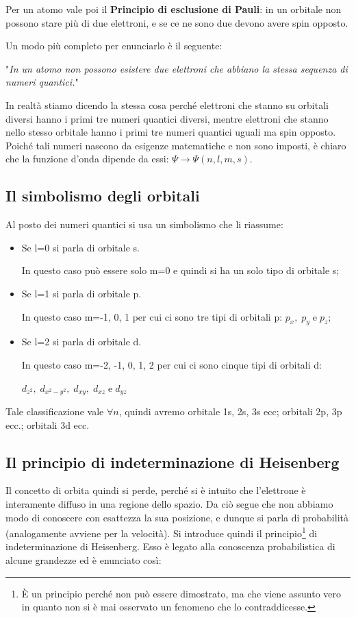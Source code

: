 Per un atomo vale poi il \textbf{Principio di esclusione di Pauli}: in un orbitale non possono stare più di due elettroni, e se ce ne sono due devono avere spin opposto.

Un modo più completo per enunciarlo è il seguente:

"\textit{In un atomo non possono esistere due elettroni che abbiano la stessa sequenza di numeri quantici.}"

In realtà stiamo dicendo la stessa cosa perché elettroni che stanno su orbitali diversi hanno i primi tre numeri quantici diversi, mentre elettroni che stanno nello stesso orbitale hanno i primi tre numeri quantici uguali ma spin opposto.\\

Poiché tali numeri nascono da esigenze matematiche e non sono imposti, è chiaro che la funzione d'onda dipende da essi: $\Psi\rightarrow\Psi(n,l,m,s)$.

\subsection{Il simbolismo degli orbitali}
Al posto dei numeri quantici si usa un simbolismo che li riassume:
\begin{itemize}
\item Se l=0 si parla di orbitale s.

In questo caso può essere solo m=0 e quindi si ha un solo tipo di orbitale s;
\item Se l=1 si parla di orbitale p.

In questo caso m=-1, 0, 1 per cui ci sono tre tipi di orbitali p: $p_x, \; p_y \; \text{e} \; p_z$;
\item Se l=2 si parla di orbitale d.

In questo caso m=-2, -1, 0, 1, 2 per cui ci sono cinque tipi di orbitali d:

$d_{z^2}, \; d_{x^2-y^2}, \; d_{xy}, \; d_{xz} \; \text{e} \; d_{yz}$
\end{itemize}  
Tale classificazione vale $\forall n$, quindi avremo orbitale 1s, 2s, 3s ecc; orbitali 2p, 3p ecc.; orbitali 3d ecc. 

\subsection{Il principio di indeterminazione di Heisenberg}
Il concetto di orbita quindi si perde, perché si è intuito che l'elettrone è interamente diffuso in una regione dello spazio. Da ciò segue che non abbiamo modo di conoscere con esattezza la sua posizione, e dunque si parla di probabilità (analogamente avviene per la velocità).
Si introduce quindi il principio\footnote{È un principio perché non può essere dimostrato, ma che viene assunto vero in quanto non si è mai osservato un fenomeno che lo contraddicesse.} di indeterminazione di Heisenberg. Esso è legato alla conoscenza probabilistica di alcune grandezze ed è enunciato così:

